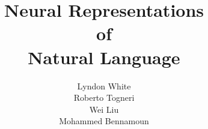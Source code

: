 \documentclass[12pt,parskip]{komatufte}
\begin{document}
\title{Neural Representations \\of\\ Natural Language}
\author{Lyndon White\\ Roberto Togneri\\ Wei Liu\\ Mohammed Bennamoun}
\publishers{SpringerBriefs in Computer Science}
\maketitle

\tableofcontents












\clearpage
{}
\printbibliography
\end{document}
